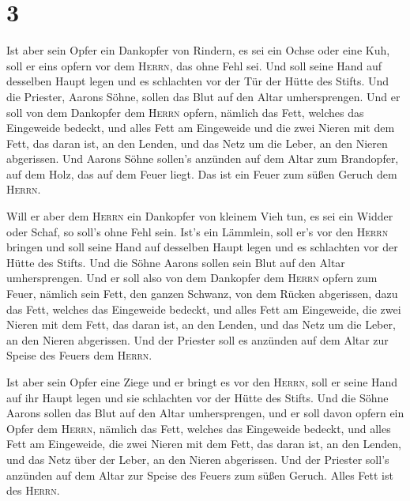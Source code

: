 \hypertarget{section-2}{%
\section{3}\label{section-2}}

 Ist aber sein Opfer ein Dankopfer von Rindern, es sei ein
Ochse oder eine Kuh, soll er eins opfern vor dem \textsc{Herrn}, das
ohne Fehl sei.  Und soll seine Hand auf desselben Haupt
legen und es schlachten vor der Tür der Hütte des Stifts. Und die
Priester, Aarons Söhne, sollen das Blut auf den Altar umhersprengen.
 Und er soll von dem Dankopfer dem \textsc{Herrn} opfern,
nämlich das Fett, welches das Eingeweide bedeckt, und alles Fett am
Eingeweide  und die zwei Nieren mit dem Fett, das daran
ist, an den Lenden, und das Netz um die Leber, an den Nieren abgerissen.
 Und Aarons Söhne sollen's anzünden auf dem Altar zum
Brandopfer, auf dem Holz, das auf dem Feuer liegt. Das ist ein Feuer zum
süßen Geruch dem \textsc{Herrn}.

 Will er aber dem \textsc{Herrn} ein Dankopfer von kleinem
Vieh tun, es sei ein Widder oder Schaf, so soll's ohne Fehl sein.
 Ist's ein Lämmlein, soll er's vor den \textsc{Herrn}
bringen  und soll seine Hand auf desselben Haupt legen und
es schlachten vor der Hütte des Stifts. Und die Söhne Aarons sollen sein
Blut auf den Altar umhersprengen.  Und er soll also von
dem Dankopfer dem \textsc{Herrn} opfern zum Feuer, nämlich sein Fett,
den ganzen Schwanz, von dem Rücken abgerissen, dazu das Fett, welches
das Eingeweide bedeckt, und alles Fett am Eingeweide, 
die zwei Nieren mit dem Fett, das daran ist, an den Lenden, und das Netz
um die Leber, an den Nieren abgerissen.  Und der Priester
soll es anzünden auf dem Altar zur Speise des Feuers dem \textsc{Herrn}.

 Ist aber sein Opfer eine Ziege und er bringt es vor den
\textsc{Herrn},  soll er seine Hand auf ihr Haupt legen
und sie schlachten vor der Hütte des Stifts. Und die Söhne Aarons sollen
das Blut auf den Altar umhersprengen,  und er soll davon
opfern ein Opfer dem \textsc{Herrn}, nämlich das Fett, welches das
Eingeweide bedeckt, und alles Fett am Eingeweide,  die
zwei Nieren mit dem Fett, das daran ist, an den Lenden, und das Netz
über der Leber, an den Nieren abgerissen.  Und der
Priester soll's anzünden auf dem Altar zur Speise des Feuers zum süßen
Geruch. Alles Fett ist des \textsc{Herrn}.

